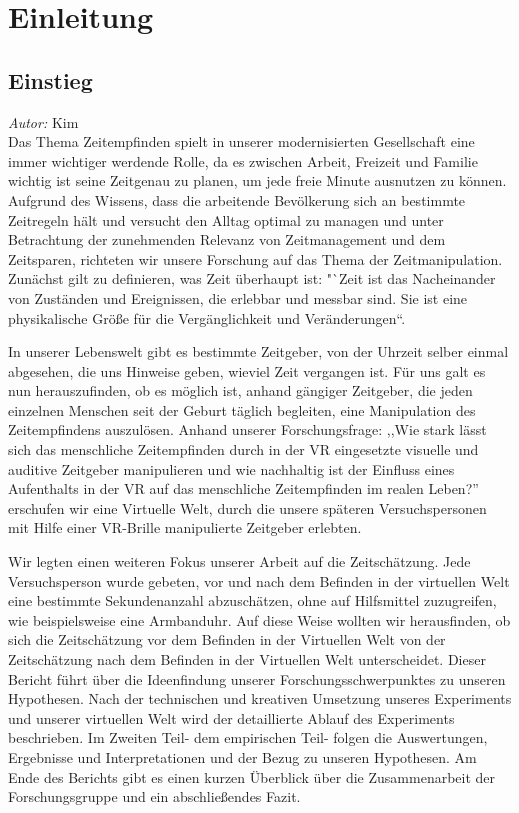 \documentclass{Bericht}
\begin{document}
\maketitle


\tableofcontents
\clearpage

\section{Einleitung}
\subsection{Einstieg}
\textit{Autor:} Kim\\
	Das Thema Zeitempfinden spielt in unserer modernisierten Gesellschaft eine immer wichtiger werdende Rolle, da es zwischen Arbeit, Freizeit und Familie wichtig ist seine Zeitgenau zu planen, um jede freie Minute ausnutzen zu können.	
	Aufgrund des Wissens, dass die arbeitende Bevölkerung sich an bestimmte Zeitregeln hält und versucht den Alltag optimal zu managen und unter Betrachtung der zunehmenden Relevanz von Zeitmanagement und dem Zeitsparen, richteten wir unsere Forschung auf das Thema der Zeitmanipulation. Zunächst gilt zu definieren, was Zeit überhaupt ist: "`Zeit ist das Nacheinander von Zuständen und Ereignissen, die erlebbar und messbar sind. Sie ist eine physikalische Größe für die Vergänglichkeit und Veränderungen“. 

	In unserer Lebenswelt gibt es bestimmte Zeitgeber, von der Uhrzeit selber einmal abgesehen, die uns Hinweise geben, wieviel Zeit vergangen ist. Für uns galt es nun herauszufinden, ob es möglich ist, anhand gängiger Zeitgeber, die jeden einzelnen Menschen seit der Geburt täglich begleiten, eine Manipulation des Zeitempfindens auszulösen. Anhand unserer Forschungsfrage: ,,Wie stark lässt sich das menschliche
Zeitempfinden durch in der VR eingesetzte visuelle und auditive Zeitgeber manipulieren und
wie nachhaltig ist der Einfluss eines Aufenthalts in der VR auf das menschliche Zeitempfinden
im realen Leben?'' erschufen wir eine Virtuelle Welt, durch die unsere späteren Versuchspersonen mit Hilfe einer VR-Brille manipulierte Zeitgeber erlebten. 

	 Wir legten einen weiteren Fokus unserer Arbeit auf die Zeitschätzung. Jede Versuchsperson wurde gebeten, vor und nach dem Befinden in der virtuellen Welt eine bestimmte Sekundenanzahl abzuschätzen, ohne auf Hilfsmittel zuzugreifen, wie beispielsweise eine Armbanduhr. Auf diese Weise wollten wir herausfinden, ob sich die Zeitschätzung vor dem Befinden in der Virtuellen Welt von der Zeitschätzung nach dem Befinden in der Virtuellen Welt unterscheidet.
Dieser Bericht führt über die Ideenfindung unserer Forschungsschwerpunktes zu unseren Hypothesen. Nach der technischen und kreativen Umsetzung unseres Experiments und unserer virtuellen Welt wird der detaillierte Ablauf des Experiments beschrieben. Im Zweiten Teil- dem empirischen Teil- folgen die Auswertungen, Ergebnisse und Interpretationen und der Bezug zu unseren Hypothesen. Am Ende des Berichts gibt es einen kurzen Überblick über die Zusammenarbeit der Forschungsgruppe und ein abschließendes Fazit. 
\end{document}
